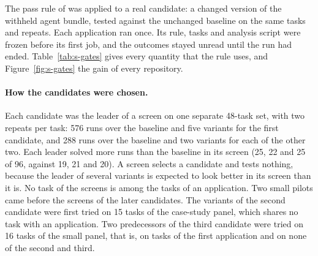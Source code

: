 The pass rule of  was applied \SGateCount{} to a real candidate: a changed version of the withheld
agent bundle, tested against the unchanged baseline on the same tasks and repeats. Each application ran once. Its rule,
tasks and analysis script were frozen before its first job, and the outcomes stayed unread until the run had ended.
Table~\ref{tab:s-gates} gives every quantity that the rule uses, and Figure~\ref{fig:s-gates} the gain of every
repository.

\paragraph{How the candidates were chosen.}
Each candidate was the leader of a screen on one separate 48-task set, with two repeats per task: 576 runs over the
baseline and five variants for the first candidate, and 288 runs over the baseline and two variants for each of the
other two. Each leader solved more runs than the baseline in its screen (25, 22 and 25 of 96, against 19, 21 and 20).
A screen selects a candidate and tests nothing, because the leader of several variants is expected to look better in
its screen than it is. No task of the screens is among the tasks of an application. Two small pilots came before the
screens of the later candidates. The variants of the second candidate were first tried on 15 tasks of the case-study
panel, which shares no task with an application. Two predecessors of the third candidate were tried on 16 tasks of the
small panel, that is, on tasks of the first application and on none of the second and third.

